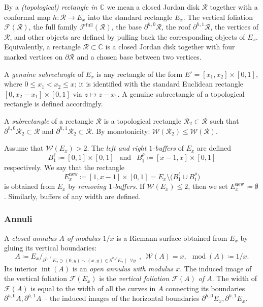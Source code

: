 \documentclass{amsart}
\renewcommand{\sp}{{\ \ }}
\newcommand{\1}{{\mathbb 1 }}
\newcommand{\Fam}{{\mathcal F}}
\newcommand{\Width}{{\mathcal W}}
\newcommand\RR{\mathcal{R}}
\newcommand\intr{\operatorname{int}}
\newcommand\new{{\operatorname{new}}}
\newcommand\full{{\operatorname{full}}}
\newcommand{\C}{\mathbb{C}}
\theoremstyle{remark}
\numberwithin{equation}{section}
\theoremstyle{definition}
\renewcommand{\mod}{\operatorname{mod}}
\begin{document}
By a \emph{(topological) rectangle in $\C$} we mean a closed Jordan disk $\RR$ together with a conformal map $h\colon \RR\to E_x$ into the standard rectangle $E_x$.  The vertical foliation $\Fam(\RR)$, the full family $\Fam^\full(\RR)$, the base $\partial^{h,0}\RR$, the roof $\partial^{h,1}\RR$, the vertices of $\RR$, and other objects are defined by pulling back the corresponding objects of $E_x$. Equivalently, a rectangle $\RR\subset\C$ is a closed Jordan disk together with four marked vertices on $\partial \RR$ and a chosen base between two vertices.


A \emph{genuine subrectangle} of $E_x$ is any rectangle of the form $E'=[x_1,x_2]\times [0,1]$, where $0\le x_1<x_2\le x$; it is identified with the standard Euclidean rectangle $[0,x_2-x_1]\times [0,1]$ via $z\mapsto z- x_1$. A genuine subrectangle of a topological rectangle is defined accordingly. 

A \emph{subrectangle} of a rectangle $\RR$ is a topological rectangle $\RR_2\subset \RR$ such that $\partial^{h,0}\RR_2\subset \RR$ and $\partial^{h,1}\RR_2\subset \RR$. By monotonicity: $\Width(\RR_2)\le \Width(\RR)$.


Assume that $\Width(E_x)>2$. The \emph{left and right $1$-buffers} of $E_x$ are defined \[ B^\ell_1\coloneqq [0,1]\times [0,1]\sp\text{ and }\sp B^\rho_1\coloneqq [x-1,x]\times [0,1]\] respectively. We say that the rectangle 
\[E^\new_x\coloneqq [1,x-1]\times [0,1]=E_x\setminus \big( B^\ell_1 \cup B^\rho_1\big)\] is obtained from $E_x$ by \emph{removing $1$-buffers}. If $\Width(E_x)\le 2$, then we set $E_x^\new\coloneqq\emptyset$. Similarly, buffers of any width are defined.




\subsubsection{Annuli}
\label{sss:annuli} 
A \emph{closed annulus $A$ of modulus $1/x$} is a Riemann surface obtained from $E_x$ by gluing its vertical boundaries:
\[A\coloneqq E_x/_{\partial^{v,\ell} E_x\ni (0,y)\sim (x,y)\in \partial^{v,\rho} E_x\mid  \sp \forall y}\sp ,\sp \Width(A)= x,\sp \mod (A)\coloneqq 1/x.\]
Its interior $\intr (A)$ is an \emph{open annulus with modulus $x$}. The induced image of the vertical foliation $\Fam(E_x)$ is the \emph{vertical foliation $\Fam(A)$ of $A$}. The width of $\Fam (A)$ is equal to the width of all the curves in $A$ connecting its boundaries $\partial^{h,0} A, \partial^{h,1} A$ --  the induced images of the horizontal boundaries $\partial^{h,0} E_x, \partial^{h,1} E_x$. 
\end{document}
